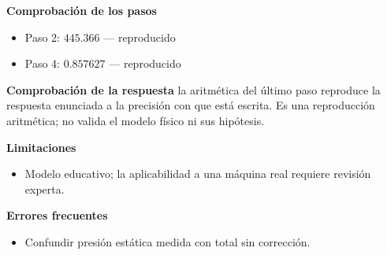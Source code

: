 \documentclass[10pt,openany]{book}
\begin{document}
\begin{tcolorbox}[title={Problema resuelto 4}, studiumworked, breakable]
\noindent\textbf{Comprobación de los pasos}
\begin{itemize}
\item Paso 2: $445.366$ — reproducido
\item Paso 4: $0.857627$ — reproducido
\end{itemize}

\noindent\textbf{Comprobación de la respuesta} la aritmética del último paso reproduce la respuesta enunciada a la precisión con que está escrita. Es una reproducción aritmética; no valida el modelo físico ni sus hipótesis.

\noindent\textbf{Limitaciones}
\begin{itemize}
\item Modelo educativo; la aplicabilidad a una máquina real requiere revisión experta.
\end{itemize}

\noindent\textbf{Errores frecuentes}
\begin{itemize}
\item Confundir presión estática medida con total sin corrección.
\end{itemize}
\end{tcolorbox}
\end{document}
